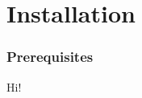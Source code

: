 \documentclass{memoir}
\begin{document}
\chapter{Installation}
\subsection{Prerequisites}
Hi!
\end{document}
